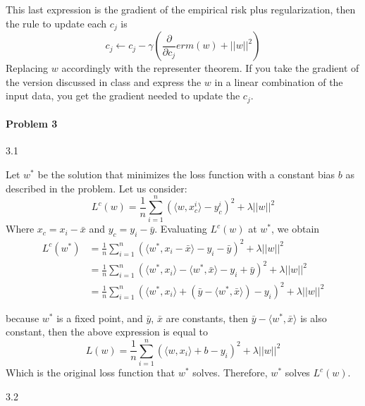\documentclass[12pt]{report}
\begin{document}
This last expression is the gradient of the empirical risk plus regularization, then the rule to update each $c_{j}$ is
$$c_{j} \gets c_{j} - \gamma\left(\frac{\partial}{\partial c_{j}} erm(w) + \lvert \lvert w \rvert \rvert^{2} \right) $$
Replacing $w$ accordingly with the representer theorem. If you take the gradient of the version discussed in class and express the $w$ in a linear combination of the input data, you get the gradient needed to update the $c_{j}$.

\paragraph{Problem 3}
3.1

Let $w^{*}$ be the solution that minimizes the loss function with a constant bias $b$ as described
in the problem. Let us consider:
$$L^{c}(w) = \frac{1}{n} \sum^{n}_{i=1}(\langle w, x^{i}_{c}\rangle - y^{i}_{c})^{2} + \lambda \lvert\lvert w \rvert\rvert^{2} $$
Where $x_{c} = x_{i} - \bar{x}$ and $y_{c} = y_{i} - \bar{y}$. Evaluating $L^{c}(w)$ at $w^{*}$, we obtain
\begin{equation}
  \begin{aligned}
    L^{c}(w^{*}) & = \frac{1}{n} \sum^{n}_{i=1}(\langle w^{*}, x_{i} - \bar{x} \rangle - y_{i} - \bar{y})^{2} + \lambda \lvert\lvert w \rvert\rvert^{2} \\
    & = \frac{1}{n} \sum^{n}_{i=1}(\langle w^{*}, x_{i} \rangle - \langle w^{*}, \bar{x} \rangle - y_{i} + \bar{y})^{2} + \lambda \lvert\lvert w \rvert\rvert^{2} \\
    & = \frac{1}{n} \sum^{n}_{i=1}(\langle w^{*}, x_{i}\rangle + (\bar{y} - \langle w^{*}, \bar{x}\rangle) - y_{i} )^{2} + \lambda \lvert\lvert w \rvert\rvert^{2}
  \end{aligned}
\end{equation}

because $w^{*}$ is a fixed point, and $\bar{y}$, $\bar{x}$ are constants, then $\bar{y} - \langle w^{*}, \bar{x} \rangle$ is also constant, then the above expression is equal to
$$L(w) = \frac{1}{n} \sum^{n}_{i=1}(\langle w, x_{i}\rangle +b - y_{i})^{2} + \lambda \lvert\lvert w \rvert\rvert^{2} $$
Which is the original loss function that $w^{*}$ solves. Therefore, $w^{*}$ solves $L^{c}(w)$.

3.2
\end{document}
